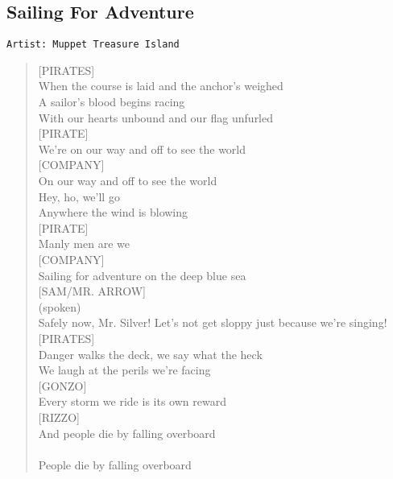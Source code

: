 \documentclass[11pt]{article}
\begin{document}
\subsection{Sailing For Adventure}
\label{sec:org9c62234}
\begin{verbatim}
Artist: Muppet Treasure Island
\end{verbatim}
\begin{verse}
[PIRATES]\\
When the course is laid and the anchor's weighed\\
A sailor's blood begins racing\\
With our hearts unbound and our flag unfurled\\
\vspace*{1em}
[PIRATE]\\
We're on our way and off to see the world\\
\vspace*{1em}
[COMPANY]\\
On our way and off to see the world\\
Hey, ho, we'll go\\
Anywhere the wind is blowing\\
\vspace*{1em}
[PIRATE]\\
Manly men are we\\
\vspace*{1em}
[COMPANY]\\
Sailing for adventure on the deep blue sea\\
\vspace*{1em}
[SAM/MR. ARROW]\\
(spoken)\\
Safely now, Mr. Silver! Let's not get sloppy just because we're singing!\\
\vspace*{1em}
[PIRATES]\\
Danger walks the deck, we say what the heck\\
We laugh at the perils we're facing\\
\vspace*{1em}
[GONZO]\\
Every storm we ride is its own reward\\
\vspace*{1em}
[RIZZO]\\
And people die by falling overboard\\
[COMPANY]\\
People die by falling overboard\\

\end{verse}
\end{document}
